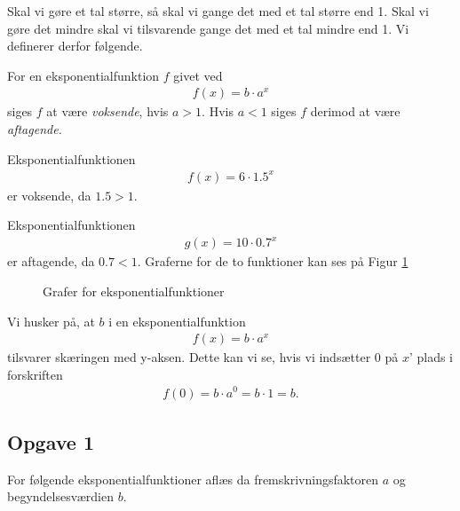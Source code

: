 Skal vi gøre et tal større, så skal vi gange det med et tal større end 1. Skal vi gøre det mindre skal vi tilsvarende gange det med et tal mindre end 1. Vi definerer derfor følgende.

\begin{defn}
	For en eksponentialfunktion $f$ givet ved
	\begin{align*}
		f(x) = b \cdot a^x
	\end{align*}
	siges $f$ at være \textit{voksende}, hvis $a>1$. Hvis $a<1$ siges $f$ derimod at være 
	\textit{aftagende.}
\end{defn}

\begin{exa}
	Eksponentialfunktionen 
	\begin{align*}
		f(x) = 6 \cdot 1.5^x
	\end{align*}
	er voksende, da $1.5 > 1$.

	Eksponentialfunktionen
	\begin{align*}
		g(x) = 10 \cdot 0.7^x
	\end{align*}
	er aftagende, da $0.7 < 1$.
	Graferne for de to funktioner kan ses på Figur \ref{fig:eksp}
	\begin{figure}[H]
		\centering
		\caption{Grafer for eksponentialfunktioner}
		\label{fig:eksp}
	\end{figure}
\end{exa}

Vi husker på, at $b$ i en eksponentialfunktion 
\begin{align*}
	f(x) = b \cdot a^x
\end{align*}
tilsvarer skæringen med y-aksen. Dette kan vi se, hvis vi indsætter $0$ på $x$' plads i forskriften
\begin{align*}
	f(0) = b \cdot a^0 = b \cdot 1 = b.
\end{align*}

\subsection*{Opgave 1}
For følgende eksponentialfunktioner aflæs da fremskrivningsfaktoren $a$ og begyndelsesværdien $b$.

